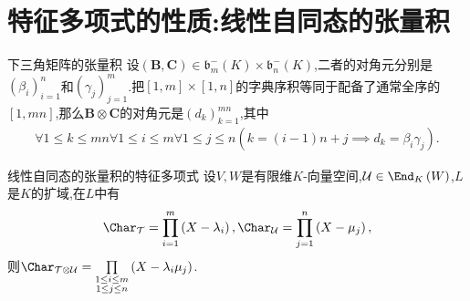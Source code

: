 \section{特征多项式的性质:线性自同态的张量积}

\begin{lemma}{下三角矩阵的张量积}{}
	设$\left(\boldsymbol{B},\boldsymbol{C}\right)\in\mathfrak{b}_{m}^{-}\left(K\right)\times\mathfrak{b}_{n}^{-}\left(K\right)$,二者的对角元分别是$\left(\beta_{i}\right)_{i=1}^{n}$和$\left(\gamma_{j}\right)_{j=1}^{m}$.把$\left[1,m\right]\times\left[1,n\right]$的字典序积等同于配备了通常全序的$\left[1,mn\right]$,那么$\boldsymbol{B}\otimes\boldsymbol{C}$的对角元是$\left(d_{k}\right)_{k=1}^{mn}$,其中
	\begin{align*}
		\forall 1\leq k\leq mn\forall 1\leq i\leq m\forall 1\leq j\leq n\left(k=\left(i-1\right)n+j\implies d_{k}=\beta_{i}\gamma_{j}\right).
	\end{align*}
\end{lemma}

\begin{proposition}{线性自同态的张量积的特征多项式}{}
	设$V,W$是有限维$K$-向量空间,$\mathcal{U}\in\End_{K}\left(W\right)$,$L$是$K$的扩域,在$L$中有
	\begin{align*}
		\Char_{\mathcal{T}}=\prod\limits_{i=1}^{m}\left(X-\lambda_{i}\right),\Char_{\mathcal{U}}=\prod\limits_{j=1}^{n}\left(X-\mu_{j}\right),
	\end{align*}
	则$\Char_{\mathcal{T}\otimes\mathcal{U}}=\prod\limits_{\substack{1\leq i\leq m\\ 1\leq j\leq n}}\left(X-\lambda_{i}\mu_{j}\right)$.
\end{proposition}